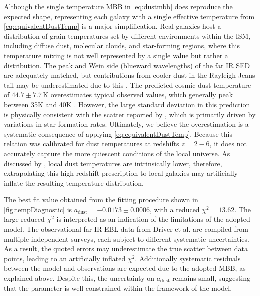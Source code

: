 \documentclass[
    a4paper, %
    10pt, %
    unnumberedsections, %
]{LTJournalArticle}
\begin{document}
Although the single temperature MBB in \cref{eq:dustmbb} does reproduce the expected shape, representing each galaxy with a single effective temperature from \cref{eq:equivalentDustTemp} is a major simplification. Real galaxies host a distribution of grain temperatures set by different environments within the ISM, including diffuse dust, molecular clouds, and star-forming regions, where this temperature mixing is not well represented by a single value but rather a distribution. The peak and Wein side (blueward wavelengths) of the far IR SED are adequately matched, but contributions from cooler dust in the Rayleigh-Jeans tail may be underestimated due to this \parencite{caseyFarinfraredSpectralEnergy2012}. The predicted cosmic dust temperature of $44.7 \pm 7.7$\,K overestimates typical observed values, which generally peak between 35K and 40K \parencite{trainaA3COSMOSDustMass2024,ealesRiseFallDust2024}. However, the large standard deviation in this prediction is physically consistent with the scatter reported by \cite{liangDustTemperaturesHighredshift2019}, which is primarily driven by variations in star formation rates. Ultimately, we believe the overestimation is a systematic consequence of applying \cref{eq:equivalentDustTemp}. Because this relation was calibrated for dust temperatures at redshifts $z = 2-6$, it does not accurately capture the more quiescent conditions of the local universe. As discussed by \cite{parenteDriversCosmicDust2026}, local dust temperatures are intrinsically lower, therefore, extrapolating this high redshift prescription to local galaxies may artificially inflate the resulting temperature distribution.

The best fit value obtained from the fitting procedure shown in \cref{fig:tempDiagnostic} is $a_\mathrm{dust} = -0.0173 \pm 0.0006$, with a reduced $\chi^2 = 13.62$. The large reduced $\chi^2$ is interpreted as an indication of the limitations of the adopted model. The observational far IR EBL data from Driver et al. are compiled from multiple independent surveys, each subject to different systematic uncertainties. As a result, the quoted errors may underestimate the true scatter between data points, leading to an artificially inflated $\chi^2$. Additionally systematic residuals between the model and observations are expected due to the adopted MBB, as explained above. Despite this, the uncertainty on $a_\mathrm{dust}$ remains small, suggesting that the parameter is well constrained within the framework of the model.

\end{document}
